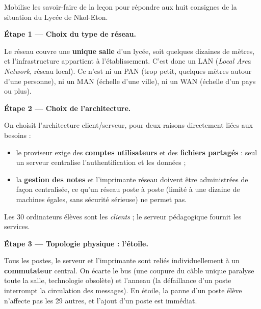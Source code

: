 \documentclass[11pt]{article}
\newcommand{\cle}[1]{{\popxbold\color{popdark}#1}}
\begin{document}
\begin{exoresolu}
Mobilise les savoir-faire de la leçon pour répondre aux huit consignes de la situation du Lycée de Nkol-Eton.

\tcblower

\textbf{Étape 1 — Choix du type de réseau.}

Le réseau couvre une \textbf{unique salle} d'un lycée, soit quelques dizaines de mètres, et l'infrastructure appartient à l'établissement. C'est donc un \cle{LAN} (\emph{Local Area Network}, réseau local). Ce n'est ni un PAN (trop petit, quelques mètres autour d'une personne), ni un MAN (échelle d'une ville), ni un WAN (échelle d'un pays ou plus).

\textbf{Étape 2 — Choix de l'architecture.}

On choisit l'architecture \cle{client/serveur}, pour deux raisons directement liées aux besoins :
\begin{itemize}
\item le proviseur exige des \textbf{comptes utilisateurs} et des \textbf{fichiers partagés} : seul un serveur centralise l'authentification et les données ;
\item la \textbf{gestion des notes} et l'imprimante réseau doivent être administrées de façon centralisée, ce qu'un réseau poste à poste (limité à une dizaine de machines égales, sans sécurité sérieuse) ne permet pas.
\end{itemize}
Les 30 ordinateurs élèves sont les \emph{clients} ; le serveur pédagogique fournit les services.

\textbf{Étape 3 — Topologie physique : l'étoile.}

Tous les postes, le serveur et l'imprimante sont reliés individuellement à un \textbf{commutateur} central. On écarte le bus (une coupure du câble unique paralyse toute la salle, technologie obsolète) et l'anneau (la défaillance d'un poste interrompt la circulation des messages). En étoile, la panne d'un poste élève n'affecte pas les 29 autres, et l'ajout d'un poste est immédiat.


\end{exoresolu}
\end{document}
